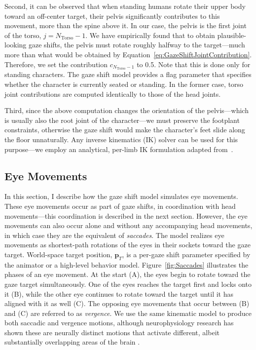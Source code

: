 Second, it can be observed that when standing humans rotate their upper body toward an off-center target, their pelvis significantly contributes to this movement, more than the spine above it. In our case, the pelvis is the first joint of the torso, $j = N_{\mathrm{Torso}} - 1$. We have empirically found that to obtain plausible-looking gaze shifts, the pelvis must rotate roughly halfway to the target---much more than what would be obtained by Equation~\ref{eq:GazeShiftJointContribution}. Therefore, we set the contribution $c_{N_{\mathrm{Torso}} -1}$ to 0.5. Note that this is done only for standing characters. The gaze shift model provides a flag parameter that specifies whether the character is currently seated or standing. In the former case, torso joint contributions are computed identically to those of the head joints.

Third, since the above computation changes the orientation of the pelvis---which is usually also the root joint of the character---we must preserve the footplant constraints, otherwise the gaze shift would make the character's feet slide along the floor unnaturally. Any inverse kinematics (IK) solver can be used for this purpose---we employ an analytical, per-limb IK formulation adapted from~\citep{shin2001puppetry}.

\subsection{Eye Movements}
\label{sec:GazeShiftEyes}

In this section, I describe how the gaze shift model simulates eye movements. These eye movements occur as part of gaze shifts, in coordination with head movements---this coordination is described in the next section. However, the eye movements can also occur alone and without any accompanying head movements, in which case they are the equivalent of \emph{saccades}.
The model realizes eye movements as shortest-path rotations of the eyes in their sockets toward the gaze target. World-space target position, $\mathbf{p}_T$, is a per-gaze shift parameter specified by the animator or a high-level behavior model. Figure~\ref{fig:Saccades} illustrates the phases of an eye movement. At the start (A), the eyes begin to rotate toward the gaze target simultaneously. One of the eyes reaches the target first and locks onto it (B), while the other eye continues to rotate toward the target until it has aligned with it as well (C). The opposing eye movements that occur between (B) and (C) are referred to as \emph{vergence}. We use the same kinematic model to produce both saccadic and vergence motions, although neurophysiology research has shown these are neurally distinct motions that activate different, albeit substantially overlapping areas of the brain \citep{alkan2011differentiation}.

